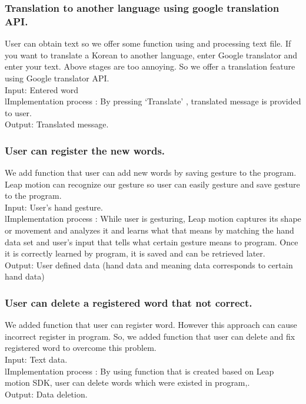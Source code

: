 \documentclass[10pt,journal,compsoc]{IEEEtran}
\begin{document}
\subsubsection{ Translation to another language using google translation API.}

User can obtain text so we offer some function using and processing text file. If you want to translate a Korean to another language, enter Google translator and enter your text. Above stages are too annoying. So we offer a translation feature using Google translator API.
\\Input: Entered word
\\lImplementation process :  By pressing ‘Translate’ , translated message is provided to user.
\\Output: Translated message.

\subsubsection{ User can register the new words.}

We add function that user can add new words by saving gesture to the program. Leap motion can recognize our gesture so user can easily gesture and save gesture to the program.
\\Input:  User’s hand gesture.
\\lImplementation process :   While user is gesturing, Leap motion captures its shape or movement and analyzes it and learns what that means by matching the hand data set and user’s input that tells what certain gesture means to program. Once it is correctly learned by program, it is saved and can be retrieved later.
\\Output: User defined data (hand data and meaning data corresponds to certain hand data)

\subsubsection{ User can delete a registered word that not correct.}

We added function that user can register word. However this approach can cause incorrect register in program. So, we added function that user can delete and fix registered word to overcome this problem.
\\Input:  Text data.
\\lImplementation process :   By using function that is created based on Leap motion SDK, user can delete words which were existed in program,.
\\Output:  Data deletion.
\end{document}
